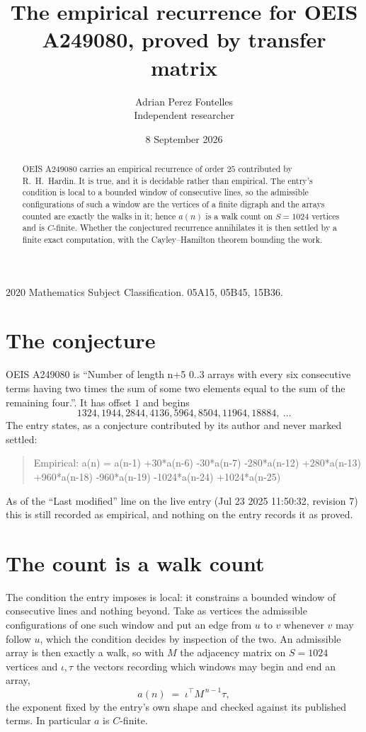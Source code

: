 \documentclass[11pt,a4paper]{article}
\title{The empirical recurrence for OEIS A249080, proved by transfer matrix}
\author{Adrian Perez Fontelles\\ \small Independent researcher}
\date{8 September 2026}
\theoremstyle{plain}
\theoremstyle{definition}
\begin{document}
\maketitle

\begin{abstract}
OEIS A249080 carries an empirical recurrence of order $25$ contributed by R.~H.~Hardin. It is
true, and it is decidable rather than empirical. The entry's condition is local to a bounded window of consecutive lines, so
the admissible configurations of such a window are the vertices of a finite digraph and the
arrays counted are exactly the walks in it; hence $a(n)$ is a walk count on $S=1024$ vertices
and is $C$-finite. Whether the conjectured recurrence annihilates it is then settled by a
finite exact computation, with the Cayley--Hamilton theorem bounding the work.
\end{abstract}

\noindent\small 2020 Mathematics Subject Classification. 05A15, 05B45, 15B36.\normalsize

\section{The conjecture}

OEIS A249080 is ``Number of length n+5 0..3 arrays with every six consecutive terms having two times the sum of some two elements equal to the sum of the remaining four.''. It has offset $1$ and begins
\[
1324, 1944, 2844, 4136, 5964, 8504, 11964, 18884,\ \dots
\]
The entry states, as a conjecture contributed by its author and never marked settled:
\begin{quote}
Empirical: a(n) = a(n-1) +30*a(n-6) -30*a(n-7) -280*a(n-12) +280*a(n-13) +960*a(n-18) -960*a(n-19) -1024*a(n-24) +1024*a(n-25)
\end{quote}
As of the ``Last modified'' line on the live entry (Jul 23 2025 11:50:32, revision 7) this is still
recorded as empirical, and nothing on the entry records it as proved.

\section{The count is a walk count}

The condition the entry imposes is local: it constrains a bounded window of consecutive lines and nothing beyond. Take as
vertices the admissible configurations of one such window and put an edge from $u$ to $v$
whenever $v$ may follow $u$, which the condition decides by inspection of the two. An
admissible array is then exactly a walk, so with $M$ the adjacency matrix on $S=1024$ vertices
and $\iota,\tau$ the vectors recording which windows may begin and end an array,
\[
a(n)\;=\;\iota^{\!\top}M^{\,n-1}\tau ,
\]
the exponent fixed by the entry's own shape and checked against its published terms. In
particular $a$ is $C$-finite.
\end{document}
